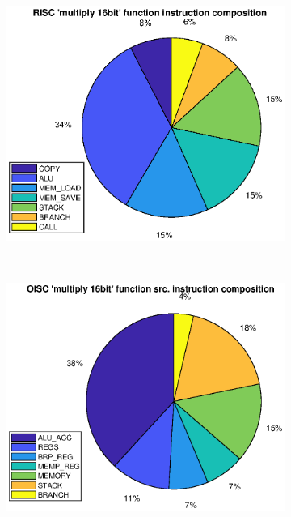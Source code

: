 \documentclass[a4paper,12pt]{article}
\begin{document}
\begin{figure}[b!]
	\centering
	\begin{subfigure}[b]{0.3\textwidth}
		\includegraphics[width=1.3\textwidth]{../tests/risc_mul16_comp.eps}
		\caption{}
		\label{fig:t0}
	\end{subfigure}
	~
	\begin{subfigure}[b]{0.3\textwidth}
		\includegraphics[width=1.3\textwidth]{../tests/oisc_mul16_src_comp.eps}
		\caption{}
		\label{fig:t1}
	\end{subfigure}
	~
	\begin{subfigure}[b]{0.3\textwidth}

\end{subfigure}
\end{figure}
\end{document}

